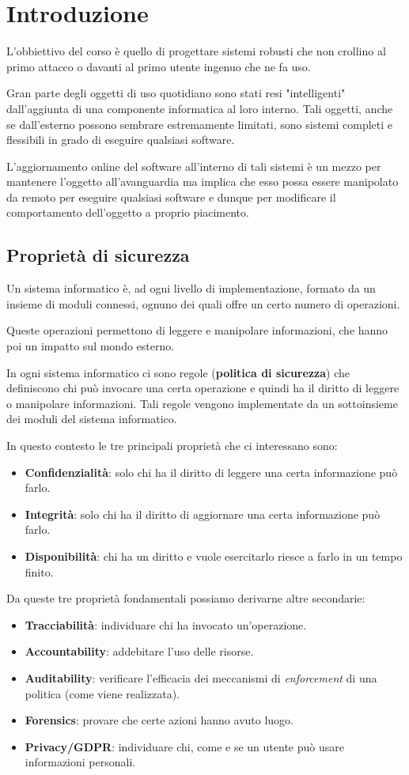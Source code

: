 \chapter{Introduzione}
L'obbiettivo del corso è quello di progettare sistemi robusti che non crollino al primo attacco o davanti al
primo utente ingenuo che ne fa uso.

Gran parte degli oggetti di uso quotidiano sono stati resi "intelligenti" dall'aggiunta di una componente
informatica al loro interno. Tali oggetti, anche se dall'esterno possono sembrare estremamente limitati, sono
sistemi completi e flessibili in grado di eseguire qualsiasi software.

L'aggiornamento online del software all'interno di tali sistemi è un mezzo per mantenere l'oggetto all'avanguardia
ma implica che esso possa essere manipolato da remoto per eseguire qualsiasi software e dunque per modificare
il comportamento dell'oggetto a proprio piacimento.

\section{Proprietà di sicurezza}
Un sistema informatico è, ad ogni livello di implementazione, formato da un insieme di moduli connessi, ognuno dei
quali offre un certo numero di operazioni.

Queste operazioni permettono di leggere e manipolare informazioni, che hanno poi un impatto sul mondo esterno.

In ogni sistema informatico ci sono regole (\textbf{politica di sicurezza}) che definiscono chi può invocare una
certa operazione e quindi ha il diritto di leggere o manipolare informazioni. Tali regole vengono implementate da
un sottoinsieme dei moduli del sistema informatico.

In questo contesto le tre principali proprietà che ci interessano sono:
\begin{itemize}
	\item \textbf{Confidenzialità}: solo chi ha il diritto di leggere una certa informazione può farlo.
	\item \textbf{Integrità}: solo chi ha il diritto di aggiornare una certa informazione può farlo.
	\item \textbf{Disponibilità}: chi ha un diritto e vuole esercitarlo riesce a farlo in un tempo finito.
\end{itemize}
Da queste tre proprietà fondamentali possiamo derivarne altre secondarie:
\begin{itemize}
	\item \textbf{Tracciabilità}: individuare chi ha invocato un'operazione.
	\item \textbf{Accountability}: addebitare l'uso delle risorse.
	\item \textbf{Auditability}: verificare l'efficacia dei meccanismi di \emph{enforcement} di una politica (come
	      viene realizzata).
	\item \textbf{Forensics}: provare che certe azioni hanno avuto luogo.
	\item \textbf{Privacy/GDPR}: individuare chi, come e se un utente può usare informazioni personali.
\end{itemize}

